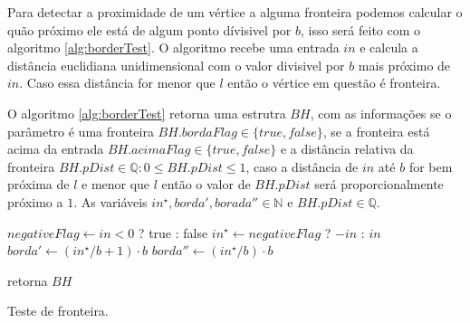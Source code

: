 Para detectar a proximidade de um vértice a alguma fronteira podemos calcular o 
quão próximo ele está de algum ponto dívisivel por $b$, isso será feito com 
o algoritmo \ref{alg:borderTest}. O algoritmo recebe uma entrada $in$ e calcula
a distância euclidiana unidimensional com o valor divisivel por $b$ mais próximo 
de $in$. Caso essa distância for menor que $l$ então o vértice em questão é 
fronteira.

O algoritmo \ref{alg:borderTest} retorna uma estrutra $BH$, com as informações
se o parâmetro é uma fronteira $BH.bordaFlag \in \{true, false\}$, se a fronteira 
está acima da entrada $BH.acimaFlag \in \{true, false\}$ e a distância relativa 
da fronteira $BH.pDist \in \mathbb{Q}: 0 \leq BH.pDist \leq 1$, caso a distância de $in$ até $b$ for bem 
próxima de $l$ e menor que $l$ então o valor de $BH.pDist$ será proporcionalmente
próximo a $1$. As variáveis
$in^{\star}, borda', borada'' \in \mathbb{N}$ e $BH.pDist \in \mathbb{Q}$.

\begin{algorithm}[H]\label{alg:borderTest}%
    $negativeFlag \leftarrow in < 0$ ? true : false\;
    $in^{\star} \leftarrow negativeFlag$ ? $-in$ : $in$\;
    $borda' \leftarrow (in^{\star}/b +1) \cdot b$\;
    $borda'' \leftarrow (in^{\star}/b) \cdot b$\;
    
    retorna $BH$\;
    \caption{Teste de fronteira.}
\end{algorithm}

